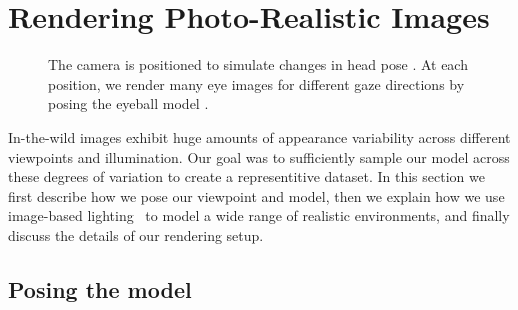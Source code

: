 
\section{Rendering Photo-Realistic Images}

\begin{figure}
	\captionsetup[subfigure]{labelformat=empty} %
    \captionsetup{subrefformat=parens} %
    \centering
    \begin{subfigure}[t]{0.48\columnwidth}
        \caption{}\label{fig:cam_pos_spher_coords}
    \end{subfigure}
    \hfill
    \begin{subfigure}[t]{0.48\columnwidth}
        \caption{}\label{fig:cam_pos_example_renders}
    \end{subfigure}
    \par\vspace{-28pt}
    \caption{The camera is positioned to simulate changes in head pose . At each position, we render many eye images for different gaze directions by posing the eyeball model .}
    \label{fig:cam_pos}
\end{figure}

In-the-wild images exhibit huge amounts of appearance variability across different viewpoints and illumination. Our goal was to sufficiently sample our model across these degrees of variation to create a representitive dataset.
In this section we first describe how we pose our viewpoint and model, then we explain how we use image-based lighting~\cite{debevec2002image} to model a wide range of realistic environments, and finally discuss the details of our rendering setup.

\subsection{Posing the model}

